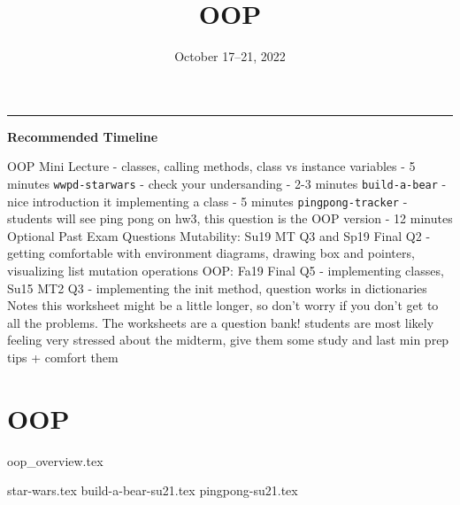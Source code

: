 \documentclass{exam}
\title{\textsc{OOP}}
\date{October 17--21, 2022}
\begin{document}
	\maketitle
	\rule{\textwidth}{0.15em}
	\fontsize{12}{15}\selectfont

\begin{guide}
	\textbf{Recommended Timeline}
	\begin{outline}[enumerate]
		\1 OOP Mini Lecture - classes, calling methods, class vs instance variables - 5 minutes
		\1 \lstinline{wwpd-starwars} - check your undersanding - 2-3 minutes
		\1 \lstinline{build-a-bear} - nice introduction it implementing a class - 5 minutes 
		\1 \lstinline{pingpong-tracker} - students will see ping pong on hw3, this question is the OOP version - 12 minutes
		\1 Optional Past Exam Questions
		\2 Mutability: Su19 MT Q3 and Sp19 Final Q2 - getting comfortable with environment diagrams, drawing box and pointers, visualizing list mutation operations
		\2 OOP: Fa19 Final Q5 - implementing classes, Su15 MT2 Q3 - implementing the init method, question works in dictionaries
		\1 Notes
		\2 this worksheet might be a little longer, so don't worry if you don't get to all the problems. The worksheets are a question bank!
		\2 students are most likely feeling very stressed about the midterm, give them some study and last min prep tips + comfort them
	\end{outline}
\end{guide}


\section{OOP}
{oop_overview.tex}
\newpage
\begin{questions}
{star-wars.tex}
\newpage
{build-a-bear-su21.tex}
{pingpong-su21.tex}
\end{questions}
\end{document}
